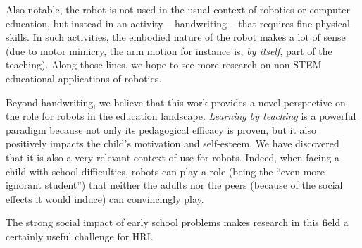 \documentclass{sig-alternate}
\begin{document}
Also notable, the robot is not used in the usual context of robotics or computer
education, but instead in an activity -- handwriting -- that requires fine
physical skills. In such activities, the embodied nature of the robot makes a
lot of sense (due to motor mimicry, the arm motion for instance is, \emph{by
itself}, part of the teaching). Along those lines, we hope to see more research
on non-STEM educational applications of robotics.

Beyond handwriting, we believe that this work provides a novel perspective on
the role for robots in the education landscape. \emph{Learning by teaching} is a
powerful paradigm because not only its pedagogical efficacy is proven, but it
also positively impacts the child's motivation and self-esteem. We have
discovered that it is also a very relevant context of use for robots. Indeed,
when facing a child with school difficulties, robots can play a role (being the
``even more ignorant student'') that neither the adults nor the peers (because
of the social effects it would induce) can convincingly play.

The strong social impact of early school problems makes research in this field
a certainly useful challenge for HRI.








\end{document}
